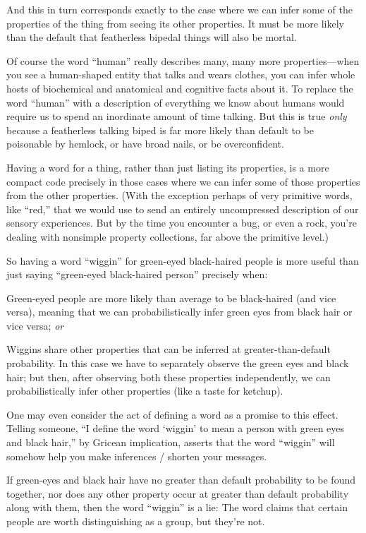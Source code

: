 {
 And this in turn corresponds exactly to the case where we can
infer some of the properties of the thing from seeing its other
properties. It must be more likely than the default that featherless
bipedal things will also be mortal.}

{
 Of course the word ``human''
really describes many, many more properties---when you see a
human-shaped entity that talks and wears clothes, you can infer whole
hosts of biochemical and anatomical and cognitive facts about it. To
replace the word ``human'' with a
description of everything we know about humans would require us to
spend an inordinate amount of time talking. But this is true
\textit{only} because a featherless talking biped is far more likely
than default to be poisonable by hemlock, or have broad nails, or be
overconfident.}

{
 Having a word for a thing, rather than just listing its
properties, is a more compact code precisely in those cases where we
can infer some of those properties from the other properties. (With the
exception perhaps of very primitive words, like
``red,'' that we would use to send
an entirely uncompressed description of our sensory experiences. But by
the time you encounter a bug, or even a rock, you're
dealing with nonsimple property collections, far above the primitive
level.)}

{
 So having a word ``wiggin'' for
green-eyed black-haired people is more useful than just saying
``green-eyed black-haired person''
precisely when:}

{
 Green-eyed people are more likely than average to be black-haired
(and vice versa), meaning that we can probabilistically infer green
eyes from black hair or vice versa; \textit{or}}

{
 Wiggins share other properties that can be inferred at
greater-than-default probability. In this case we have to separately
observe the green eyes and black hair; but then, after observing both
these properties independently, we can probabilistically infer other
properties (like a taste for ketchup).}

{
 One may even consider the act of defining a word as a promise to
this effect. Telling someone, ``I define the word
`wiggin' to mean a person with green
eyes and black hair,'' by Gricean implication,
asserts that the word ``wiggin''
will somehow help you make inferences / shorten your messages.}

{
 If green-eyes and black hair have no greater than default
probability to be found together, nor does any other property occur at
greater than default probability along with them, then the word
``wiggin'' is a lie: The word claims
that certain people are worth distinguishing as a group, but
they're not.}

